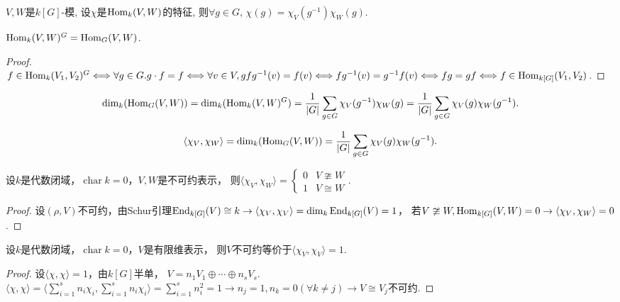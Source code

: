\begin{proposition}
    $V,W$是$k[G]$-模, 设$\chi$是$\operatorname{Hom}_k(V,W)$的特征, 
    则$\forall g\in G$, $\chi(g)=\chi_V(g^{-1})\chi_W(g)$.
\end{proposition}

\begin{proposition}
    $\operatorname{Hom}_k(V,W)^G=\operatorname{Hom}_G(V,W)$.
\end{proposition}
\begin{proof}
	$f\in \operatorname{Hom}_k(V_1,V_2)^G\Longleftrightarrow \forall g\in G.g\cdot f=f
    \Longleftrightarrow\forall v\in V,gfg^{-1}(v)=f(v)
    \Longleftrightarrow fg^{-1}(v)=g^{-1}f(v)
    \Longleftrightarrow fg=gf \Longleftrightarrow f\in \operatorname{Hom}_{k[G]}(V_1,V_2)$.
\end{proof}
\begin{proposition}
    $$\dim_k(\operatorname{Hom}_G(V,W))=\dim_k(\operatorname{Hom}_k(V,W)^G)
    =\frac{1}{|G|}\sum_{g\in G} \chi_V(g^{-1})\chi_W(g)
    =\frac{1}{|G|}\sum_{g\in G} \chi_V(g)\chi_W(g^{-1}).$$
\end{proposition}

\begin{definition}
    $$\langle\chi_V,\chi_W\rangle=\dim_k(\operatorname{Hom}_G(V,W))
    =\frac{1}{|G|}\sum_{g\in G} \chi_V(g)\chi_W(g^{-1}).$$
\end{definition}

\begin{proposition}
    设$k$是代数闭域，$\operatorname{char}k=0$，$V,W$是不可约表示，
    则$\langle\chi_V,\chi_W\rangle=\begin{cases} 0 &V\ncong W\\ 
    1 &V\cong W \end{cases}$.
\end{proposition}
\begin{proof}
	设$(\rho,V)$不可约，由Schur引理$\operatorname{End}_{k[G]}(V)\cong k
    \rightarrow\langle \chi_V,\chi_V \rangle=\dim_k\operatorname{End}_{k[G]}(V)=1$，
    若$V\ncong W,\operatorname{Hom}_{k[G]}(V,W)=0\rightarrow\langle \chi _V,\chi _W \rangle=0$.
\end{proof}
\begin{theorem}
    设$k$是代数闭域，$\operatorname{char}k=0$，$V$是有限维表示，
    则$V$不可约等价于$\langle\chi_V,\chi_V\rangle=1$.

\end{theorem}
\begin{proof}
	设$ \langle \chi,\chi \rangle =1$，由$k[G]$半单，
    $V=n_1V_1\oplus\cdots\oplus n_sV_s$.
	$ \langle \chi,\chi \rangle =\langle \sum_{i=1}^{s} n_i\chi_i ,
    \sum_{i=1}^{s} n_i\chi_i\rangle=\sum_{i=1}^{s} n_i^2=1
    \rightarrow n_j=1,n_k=0(\forall k\neq j)\rightarrow V\cong V_j$不可约.
\end{proof}

